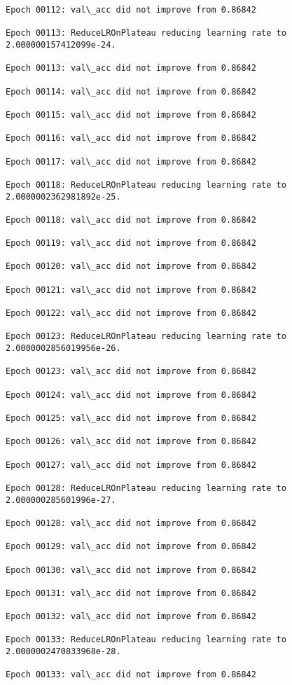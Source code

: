 \documentclass[11pt]{article}
\begin{document}
\begin{Verbatim}[commandchars=\\\{\}]
Epoch 00112: val\_acc did not improve from 0.86842

Epoch 00113: ReduceLROnPlateau reducing learning rate to 2.000000157412099e-24.

Epoch 00113: val\_acc did not improve from 0.86842

Epoch 00114: val\_acc did not improve from 0.86842

Epoch 00115: val\_acc did not improve from 0.86842

Epoch 00116: val\_acc did not improve from 0.86842

Epoch 00117: val\_acc did not improve from 0.86842

Epoch 00118: ReduceLROnPlateau reducing learning rate to 2.0000002362981892e-25.

Epoch 00118: val\_acc did not improve from 0.86842

Epoch 00119: val\_acc did not improve from 0.86842

Epoch 00120: val\_acc did not improve from 0.86842

Epoch 00121: val\_acc did not improve from 0.86842

Epoch 00122: val\_acc did not improve from 0.86842

Epoch 00123: ReduceLROnPlateau reducing learning rate to 2.0000002856019956e-26.

Epoch 00123: val\_acc did not improve from 0.86842

Epoch 00124: val\_acc did not improve from 0.86842

Epoch 00125: val\_acc did not improve from 0.86842

Epoch 00126: val\_acc did not improve from 0.86842

Epoch 00127: val\_acc did not improve from 0.86842

Epoch 00128: ReduceLROnPlateau reducing learning rate to 2.000000285601996e-27.

Epoch 00128: val\_acc did not improve from 0.86842

Epoch 00129: val\_acc did not improve from 0.86842

Epoch 00130: val\_acc did not improve from 0.86842

Epoch 00131: val\_acc did not improve from 0.86842

Epoch 00132: val\_acc did not improve from 0.86842

Epoch 00133: ReduceLROnPlateau reducing learning rate to 2.0000002470833968e-28.

Epoch 00133: val\_acc did not improve from 0.86842


\end{Verbatim}
\end{document}
